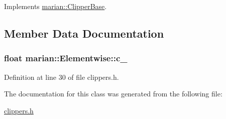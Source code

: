 Implements \hyperlink{classmarian_1_1ClipperBase_a6f7b11e38c66ff53736ad8a6c2a90610}{marian\+::\+Clipper\+Base}.



\subsection{Member Data Documentation}
\subsubsection[{\texorpdfstring{c\+\_\+}{c_}}]{\setlength{\rightskip}{0pt plus 5cm}float marian\+::\+Elementwise\+::c\+\_\+\hspace{0.3cm}{\ttfamily [private]}}\hypertarget{classmarian_1_1Elementwise_a372fd23c09e4f34b4d8043778ad4c294}{}\label{classmarian_1_1Elementwise_a372fd23c09e4f34b4d8043778ad4c294}


Definition at line 30 of file clippers.\+h.



The documentation for this class was generated from the following file\+:\begin{DoxyCompactItemize}
\item 
\hyperlink{clippers_8h}{clippers.\+h}\end{DoxyCompactItemize}
